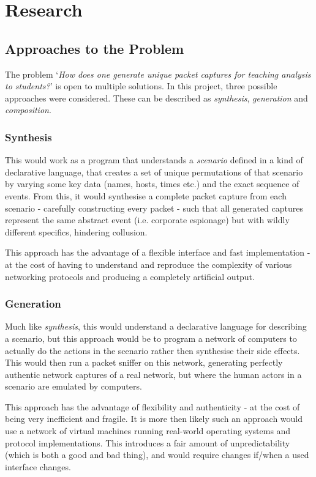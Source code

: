 \documentclass[10pt,a4paper,notitlepage,twoside]{report}
\begin{document}
\chapter{Research}
\section{Approaches to the Problem}
The problem `\emph{How does one generate unique packet captures for teaching analysis to students?}' is open to multiple solutions. In this project, three possible approaches were considered. These can be described as \emph{synthesis}, \emph{generation} and \emph{composition}.

\subsection{Synthesis}
This would work as a program that understands a \emph{scenario} defined in a kind of declarative language, that creates a set of unique permutations of that scenario by varying some key data (names, hosts, times etc.) and the exact sequence of events. From this, it would synthesise a complete packet capture from each scenario - carefully constructing every packet - such that all generated captures represent the same abstract event (i.e. corporate espionage) but with wildly different specifics, hindering collusion.

This approach has the advantage of a flexible interface and fast implementation - at the cost of having to understand and reproduce the complexity of various networking protocols and producing a completely artificial output.

\subsection{Generation}
Much like \emph{synthesis}, this would understand a declarative language for describing a scenario, but this approach would be to program a network of computers to actually do the actions in the scenario rather then synthesise their side effects. This would then run a packet sniffer on this network, generating perfectly authentic network captures of a real network, but where the human actors in a scenario are emulated by computers.

This approach has the advantage of flexibility and authenticity - at the cost of being very inefficient and fragile. It is more then likely such an approach would use a network of virtual machines running real-world operating systems and protocol implementations. This introduces a fair amount of unpredictability (which is both a good and bad thing), and would require changes if/when a used interface changes.
\end{document}
